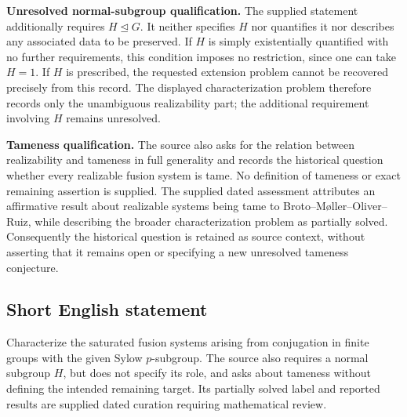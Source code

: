 \documentclass[11pt]{article}
\begin{document}
\textbf{Unresolved normal-subgroup qualification.} The supplied statement additionally requires \(H\trianglelefteq G\). It neither specifies \(H\) nor quantifies it nor describes any associated data to be preserved. If \(H\) is simply existentially quantified with no further requirements, this condition imposes no restriction, since one can take \(H=1\). If \(H\) is prescribed, the requested extension problem cannot be recovered precisely from this record. The displayed characterization problem therefore records only the unambiguous realizability part; the additional requirement involving \(H\) remains unresolved.

\textbf{Tameness qualification.} The source also asks for the relation between realizability and tameness in full generality and records the historical question whether every realizable fusion system is tame. No definition of tameness or exact remaining assertion is supplied. The supplied dated assessment attributes an affirmative result about realizable systems being tame to Broto--M{\o}ller--Oliver--Ruiz, while describing the broader characterization problem as partially solved. Consequently the historical question is retained as source context, without asserting that it remains open or specifying a new unresolved tameness conjecture.
\subsection{Short English statement}
Characterize the saturated fusion systems arising from conjugation in finite groups with the given Sylow \(p\)-subgroup. The source also requires a normal subgroup \(H\), but does not specify its role, and asks about tameness without defining the intended remaining target. Its partially solved label and reported results are supplied dated curation requiring mathematical review.
\end{document}
